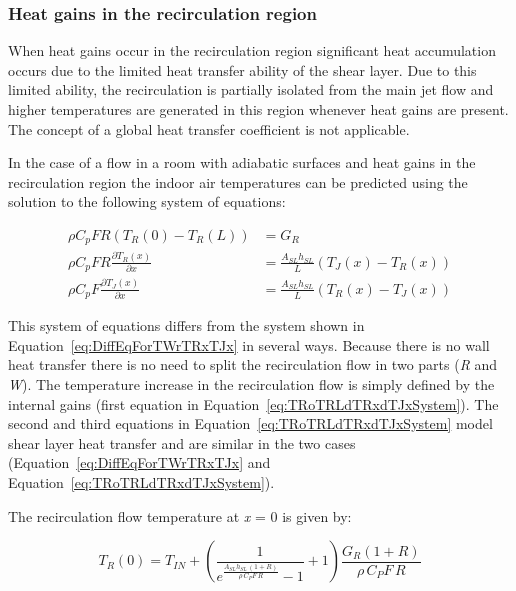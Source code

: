 \subsubsection{Heat gains in the recirculation region}\label{heat-gains-in-the-recirculation-region}

When heat gains occur in the recirculation region significant heat accumulation occurs due to the limited heat transfer ability of the shear layer. Due to this limited ability, the recirculation is partially isolated from the main jet flow and higher temperatures are generated in this region whenever heat gains are present. The concept of a global heat transfer coefficient is not applicable.

In the case of a flow in a room with adiabatic surfaces and heat gains in the recirculation region the indoor air temperatures can be predicted using the solution to the following system of equations:

\begin{equation}
  \begin{array}{rl}
    \rho C_p F R \left(T_R\left(0\right) - T_R\left(L\right)\right) & = G_R \\
    \rho C_p F R \frac{\partial T_R \left(x\right)}{\partial x} & = \frac{A_{SL} h_{SL}}{L} \left(T_J\left(x\right) - T_R \left(x\right)\right) \\
    \rho C_p F \frac{\partial T_J \left(x\right)}{\partial x} & = \frac{A_{SL} h_{SL}}{L} \left(T_R\left(x\right) - T_J \left(x\right)\right)
  \end{array}
  \label{eq:TRoTRLdTRxdTJxSystem}
\end{equation}

This system of equations differs from the system shown in Equation~\ref{eq:DiffEqForTWrTRxTJx} in several ways. Because there is no wall heat transfer there is no need to split the recirculation flow in two parts (\emph{R} and \emph{W}). The temperature increase in the recirculation flow is simply defined by the internal gains (first equation in Equation~\ref{eq:TRoTRLdTRxdTJxSystem}). The second and third equations in Equation~\ref{eq:TRoTRLdTRxdTJxSystem} model shear layer heat transfer and are similar in the two cases (Equation~\ref{eq:DiffEqForTWrTRxTJx} and Equation~\ref{eq:TRoTRLdTRxdTJxSystem}).

The recirculation flow temperature at \emph{x} = 0 is given by:

\begin{equation}
{T_R}(0) = {T_{IN}} + \left( {\frac{1}{{{e^{\frac{{{A_{SL}}{h_{SL}}\,(1 + R)}}{{\rho \,{C_P}F\,R}}}} - 1}} + 1} \right)\frac{{{G_R}(1 + R)}}{{\rho \,{C_P}F\,R}}
\end{equation}

